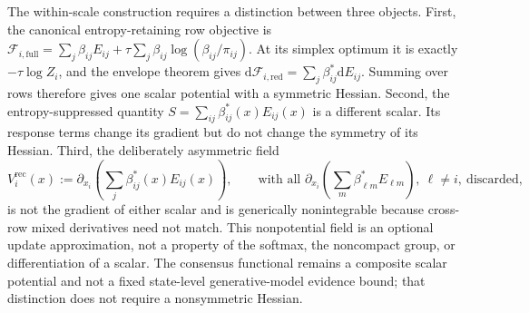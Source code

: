 The within-scale construction requires a distinction between three objects. First, the canonical entropy-retaining row objective is $\mathcal{F}_{i,\mathrm{full}}=\sum_j\beta_{ij}E_{ij}+\tau\sum_j\beta_{ij}\log(\beta_{ij}/\pi_{ij})$. At its simplex optimum it is exactly $-\tau\log Z_i$, and the envelope theorem gives $\mathrm{d}\mathcal{F}_{i,\mathrm{red}}=\sum_j\beta_{ij}^*\mathrm{d}E_{ij}$. Summing over rows therefore gives one scalar potential with a symmetric Hessian. Second, the entropy-suppressed quantity $S=\sum_{ij}\beta_{ij}^*(x)E_{ij}(x)$ is a different scalar. Its response terms change its gradient but do not change the symmetry of its Hessian. Third, the deliberately asymmetric field
\begin{equation}
V_i^{\mathrm{rec}}(x):=\partial_{x_i}\left(\sum_j\beta_{ij}^*(x)E_{ij}(x)\right),
\qquad
\text{with all }\partial_{x_i}\left(\sum_m\beta_{\ell m}^*E_{\ell m}\right),\ \ell\ne i,\ \text{discarded},
\label{eq:receiver_only_field}
\end{equation}
is not the gradient of either scalar and is generically nonintegrable because cross-row mixed derivatives need not match. This nonpotential field is an optional update approximation, not a property of the softmax, the noncompact group, or differentiation of a scalar. The consensus functional remains a composite scalar potential and not a fixed state-level generative-model evidence bound; that distinction does not require a nonsymmetric Hessian.

